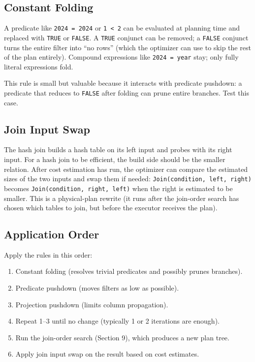 \documentclass[11pt,a4paper]{article}
\begin{document}
\subsection{Constant Folding}
A predicate like \texttt{2024 = 2024} or \texttt{1 < 2} can be evaluated at planning time and replaced with \texttt{TRUE} or \texttt{FALSE}. A \texttt{TRUE} conjunct can be removed; a \texttt{FALSE} conjunct turns the entire filter into ``no rows'' (which the optimizer can use to skip the rest of the plan entirely). Compound expressions like \texttt{2024 = year} stay; only fully literal expressions fold.

This rule is small but valuable because it interacts with predicate pushdown: a predicate that reduces to \texttt{FALSE} after folding can prune entire branches. Test this case.

\subsection{Join Input Swap}
The hash join builds a hash table on its left input and probes with its right input. For a hash join to be efficient, the build side should be the smaller relation. After cost estimation has run, the optimizer can compare the estimated sizes of the two inputs and swap them if needed: \texttt{Join(condition, left, right)} becomes \texttt{Join(condition, right, left)} when the right is estimated to be smaller. This is a physical-plan rewrite (it runs after the join-order search has chosen which tables to join, but before the executor receives the plan).

\subsection{Application Order}
Apply the rules in this order:
\begin{enumerate}
\item Constant folding (resolves trivial predicates and possibly prunes branches).
\item Predicate pushdown (moves filters as low as possible).
\item Projection pushdown (limits column propagation).
\item Repeat 1--3 until no change (typically 1 or 2 iterations are enough).
\item Run the join-order search (Section 9), which produces a new plan tree.
\item Apply join input swap on the result based on cost estimates.
\end{enumerate}
\end{document}
